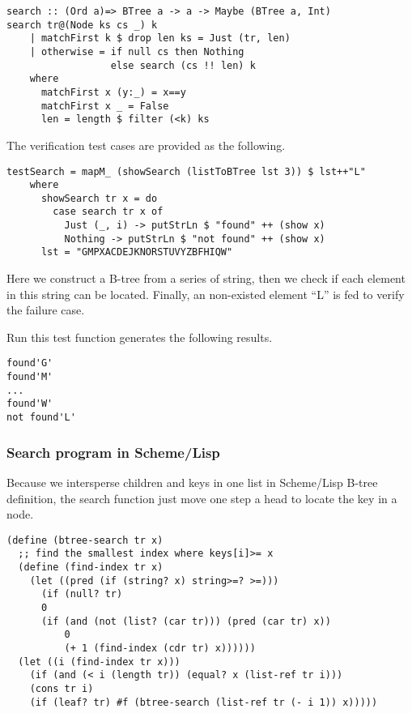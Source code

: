 \documentclass{article}
\begin{document}
\lstset{language=C++}
\begin{lstlisting}
search :: (Ord a)=> BTree a -> a -> Maybe (BTree a, Int)
search tr@(Node ks cs _) k 
    | matchFirst k $ drop len ks = Just (tr, len)
    | otherwise = if null cs then Nothing
                  else search (cs !! len) k
    where
      matchFirst x (y:_) = x==y
      matchFirst x _ = False
      len = length $ filter (<k) ks
\end{lstlisting}

The verification test cases are provided as the following.

\begin{lstlisting}
testSearch = mapM_ (showSearch (listToBTree lst 3)) $ lst++"L"
    where
      showSearch tr x = do
        case search tr x of
          Just (_, i) -> putStrLn $ "found" ++ (show x)
          Nothing -> putStrLn $ "not found" ++ (show x)
      lst = "GMPXACDEJKNORSTUVYZBFHIQW"
\end{lstlisting} %

Here we construct a B-tree from a series of string, then
we check if each element in this string can be located. 
Finally, an non-existed element ``L'' is fed to verify the
failure case.

Run this test function generates the following results.

\begin{verbatim}
found'G'
found'M'
...
found'W'
not found'L'
\end{verbatim}

\subsubsection*{Search program in Scheme/Lisp}
Because we intersperse children and keys in one list in
Scheme/Lisp B-tree definition, the search function just
move one step a head to locate the key in a node.

\lstset{language=lisp}
\begin{lstlisting}
(define (btree-search tr x)
  ;; find the smallest index where keys[i]>= x
  (define (find-index tr x)
    (let ((pred (if (string? x) string>=? >=)))
      (if (null? tr)
	  0
	  (if (and (not (list? (car tr))) (pred (car tr) x))
	      0
	      (+ 1 (find-index (cdr tr) x))))))
  (let ((i (find-index tr x)))
    (if (and (< i (length tr)) (equal? x (list-ref tr i)))
	(cons tr i)
	(if (leaf? tr) #f (btree-search (list-ref tr (- i 1)) x)))))
\end{lstlisting}
\end{document}
